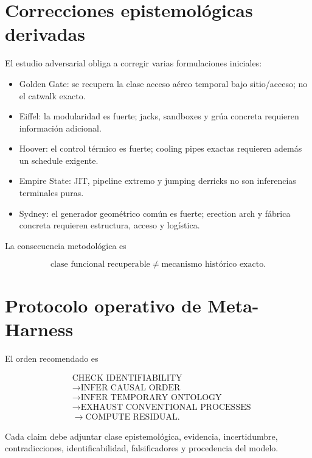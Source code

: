 \section{Correcciones epistemológicas derivadas}

El estudio adversarial obliga a corregir varias formulaciones iniciales:

\begin{itemize}
\item Golden Gate: se recupera la clase acceso aéreo temporal bajo sitio/acceso; no el catwalk exacto.
\item Eiffel: la modularidad es fuerte; jacks, sandboxes y grúa concreta requieren información adicional.
\item Hoover: el control térmico es fuerte; cooling pipes exactas requieren además un schedule exigente.
\item Empire State: JIT, pipeline extremo y jumping derricks no son inferencias terminales puras.
\item Sydney: el generador geométrico común es fuerte; erection arch y fábrica concreta requieren estructura, acceso y logística.
\end{itemize}

La consecuencia metodológica es

\begin{equation}
\boxed{
\text{clase funcional recuperable}
\neq
\text{mecanismo histórico exacto}.
}
\end{equation}

\section{Protocolo operativo de Meta-Harness}

El orden recomendado es

\begin{equation}
\boxed{
\begin{aligned}
&\text{CHECK IDENTIFIABILITY}\\
&\rightarrow
\text{INFER CAUSAL ORDER}\\
&\rightarrow
\text{INFER TEMPORARY ONTOLOGY}\\
&\rightarrow
\text{EXHAUST CONVENTIONAL PROCESSES}\\
&\rightarrow
\text{COMPUTE RESIDUAL}.
\end{aligned}
}
\end{equation}

Cada claim debe adjuntar clase epistemológica, evidencia, incertidumbre, contradicciones, identificabilidad, falsificadores y procedencia del modelo.
